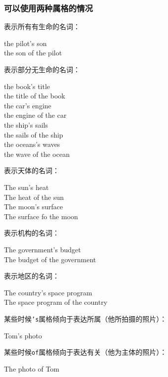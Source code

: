 \documentclass[UTF8]{ctexart}
\begin{document}
\newpage

\subsubsection{可以使用两种属格的情况}
    表示所有有生命的名词：
    \begin{center}
        \ttfamily
        the pilot's son\\[2mm]
        the son of the pilot\\[6mm]
    \end{center}
    表示部分无生命的名词：
    \begin{center}
        \ttfamily
        the book's title\\[2mm]
        the title of the book\\[5mm]
        the car's engine\\[2mm]
        the engine of the car\\[5mm]
        the ship's sails\\[2mm]
        the sails of the ship\\[5mm]
        the oceans's waves\\[2mm]
        the wave of the ocean\\[6mm]
    \end{center}
    表示天体的名词：
    \begin{center}
        \ttfamily
        The sun's heat\\[2mm]
        The heat of the sun\\[5mm]
        The moon's surface\\[2mm]
        The surface fo the moon\\[6mm]
    \end{center}
    表示机构的名词：
    \begin{center}
        \ttfamily
        The government's budget\\[2mm]
        The budget of the government\\[6mm]
    \end{center}
    表示地区的名词：
    \begin{center}
        \ttfamily
        The country's space program\\[2mm]
        The space program of the country\\[6mm]
    \end{center}

\newpage

    某些时候\texttt{\hspace{2pt}'s}属格倾向于表达所属（他所拍摄的照片）：
    \begin{center}
        \ttfamily
        Tom's photo\\[6mm]
    \end{center}
    某些时候\texttt{\hspace{2pt}of}属格倾向于表达有关（他为主体的照片）：
    \begin{center}
        \ttfamily
        The photo of Tom
    \end{center}
\end{document}
